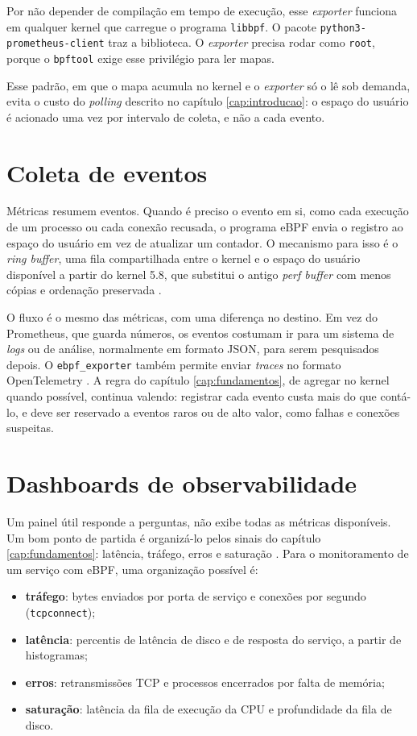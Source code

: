 Por não depender de compilação em tempo de execução, esse \textit{exporter} funciona em qualquer kernel que carregue o programa \texttt{libbpf}. O pacote \texttt{python3-prometheus-client} traz a biblioteca. O \textit{exporter} precisa rodar como \texttt{root}, porque o \texttt{bpftool} exige esse privilégio para ler mapas.

Esse padrão, em que o mapa acumula no kernel e o \textit{exporter} só o lê sob demanda, evita o custo do \textit{polling} descrito no capítulo \ref{cap:introducao}: o espaço do usuário é acionado uma vez por intervalo de coleta, e não a cada evento.

\section{Coleta de eventos}

Métricas resumem eventos. Quando é preciso o evento em si, como cada execução de um processo ou cada conexão recusada, o programa eBPF envia o registro ao espaço do usuário em vez de atualizar um contador. O mecanismo para isso é o \textit{ring buffer}, uma fila compartilhada entre o kernel e o espaço do usuário disponível a partir do kernel 5.8, que substitui o antigo \textit{perf buffer} com menos cópias e ordenação preservada \cite{linuxkernel2024}.

O fluxo é o mesmo das métricas, com uma diferença no destino. Em vez do Prometheus, que guarda números, os eventos costumam ir para um sistema de \textit{logs} ou de análise, normalmente em formato JSON, para serem pesquisados depois. O \texttt{ebpf\_exporter} também permite enviar \textit{traces} no formato OpenTelemetry \cite{ebpfexporter}. A regra do capítulo \ref{cap:fundamentos}, de agregar no kernel quando possível, continua valendo: registrar cada evento custa mais do que contá-lo, e deve ser reservado a eventos raros ou de alto valor, como falhas e conexões suspeitas.

\section{Dashboards de observabilidade}

Um painel útil responde a perguntas, não exibe todas as métricas disponíveis. Um bom ponto de partida é organizá-lo pelos sinais do capítulo \ref{cap:fundamentos}: latência, tráfego, erros e saturação \cite{beyer2016}. Para o monitoramento de um serviço com eBPF, uma organização possível é:

\begin{itemize}
  \item \textbf{tráfego}: bytes enviados por porta de serviço e conexões por segundo (\texttt{tcpconnect});
  \item \textbf{latência}: percentis de latência de disco e de resposta do serviço, a partir de histogramas;
  \item \textbf{erros}: retransmissões TCP e processos encerrados por falta de memória;
  \item \textbf{saturação}: latência da fila de execução da CPU e profundidade da fila de disco.
\end{itemize}

